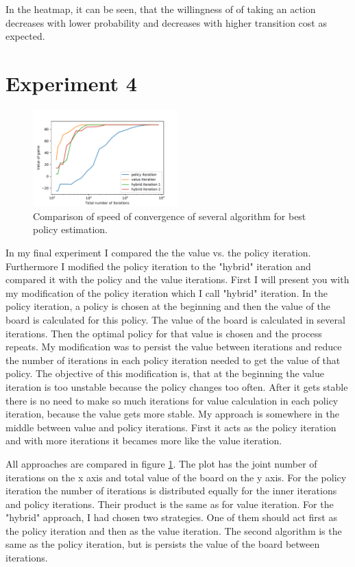 \documentclass[10pt,journal,compsoc,twoside]{IEEEtran}
\begin{document}
In the heatmap, it can be seen, that the willingness of
of taking an action decreases with lower probability and decreases with higher transition cost as expected.

\section*{Experiment 4}\label{sec:experiment4}

\begin{figure}
    \caption{Comparison of speed of convergence of several algorithm for best policy estimation.}
    \label{fig:e4}
        \includegraphics[width=0.5\textwidth, angle=0]{figures/e4.pdf}
\end{figure}

In my final experiment I compared the the value vs. the policy iteration. Furthermore I modified the policy iteration to the "hybrid" iteration and compared it with the policy and the value iterations. 
First I will present you with my modification of the policy iteration which I call "hybrid" iteration.
In the policy iteration, a policy is chosen at the beginning and then the value of the board is calculated for this policy.
The value of the board is calculated in several iterations. Then the optimal policy for that value is chosen and the process repeats.
My modification was to persist the value between iterations and reduce the number of iterations in each policy iteration needed to get the
value of that policy. The objective of this modification is, that at the beginning the
value iteration is too unstable because the policy changes too often. After it gets stable there is no need to make so much iterations for value calculation in
each policy iteration, because the value gets more stable. My approach is somewhere in the middle between value and policy iterations.
First it acts as the policy iteration and with more iterations it becames more like the value iteration.

All approaches are compared in figure \ref{fig:e4}.
The plot has the joint number of iterations on the x axis and total value of the board on the y axis.
For the policy iteration the number of iterations is distributed equally for the inner iterations and policy iterations. Their product
is the same as for value iteration. For the "hybrid" approach, I had chosen two strategies. One of them should act first as the policy iteration and then as the value iteration.
The second algorithm is the same as the policy iteration, but is persists the value of the board between iterations.
\end{document}

